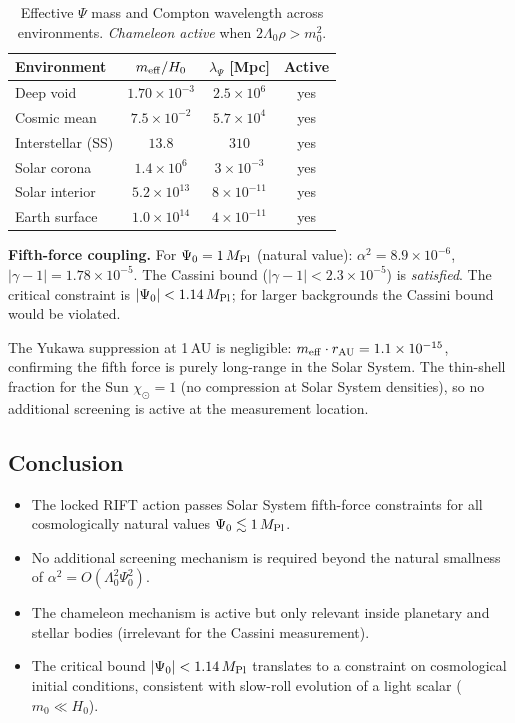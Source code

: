 \documentclass[12pt,a4paper]{article}
\begin{document}
\begin{table}[h]
\centering
\caption{Effective $\Psi$ mass and Compton wavelength across environments.
\textit{Chameleon active} when $2\Lambda_0\rho > m_0^2$.}
\label{tab:sim107_env}
\begin{tabular}{lccc}
\hline
Environment & $m_{\rm eff}/H_0$ & $\lambda_\Psi$ [Mpc] & Active \\
\hline
Deep void              & $1.70\times10^{-3}$ & $2.5\times10^{6}$ & yes \\
Cosmic mean            & $7.5\times10^{-2}$  & $5.7\times10^{4}$ & yes \\
Interstellar (SS)      & $13.8$              & $310$             & yes \\
Solar corona           & $1.4\times10^{6}$   & $3\times10^{-3}$  & yes \\
Solar interior         & $5.2\times10^{13}$  & $8\times10^{-11}$ & yes \\
Earth surface          & $1.0\times10^{14}$  & $4\times10^{-11}$ & yes \\
\hline
\end{tabular}
\end{table}

\textbf{Fifth-force coupling.}
For $\Psi_0 = 1\,M_{\rm Pl}$ (natural value):
$\alpha^2 = 8.9\times10^{-6}$,
$|\gamma-1| = 1.78\times10^{-5}$.
The Cassini bound ($|\gamma-1|<2.3\times10^{-5}$) is \emph{satisfied}.
The critical constraint is $|\Psi_0| < 1.14\,M_{\rm Pl}$; for larger backgrounds
the Cassini bound would be violated.

The Yukawa suppression at 1\,AU is negligible:
$m_{\rm eff}\cdot r_{\rm AU} = 1.1\times10^{-15}$, confirming the fifth force is
purely long-range in the Solar System.  The thin-shell fraction for the Sun
$\chi_\odot = 1$ (no compression at Solar System densities), so no
additional screening is active at the measurement location.

\subsection{Conclusion}

\begin{itemize}
  \item The locked RIFT action passes Solar System fifth-force constraints
        for all cosmologically natural values $\Psi_0 \lesssim 1\,M_{\rm Pl}$.
  \item No additional screening mechanism is required beyond the natural
        smallness of $\alpha^2 = O(\Lambda_0^2\Psi_0^2)$.
  \item The chameleon mechanism is active but only relevant inside planetary
        and stellar bodies (irrelevant for the Cassini measurement).
  \item The critical bound $|\Psi_0| < 1.14\,M_{\rm Pl}$ translates to a
        constraint on cosmological initial conditions, consistent with slow-roll
        evolution of a light scalar ($m_0 \ll H_0$).
\end{itemize}
\end{document}
